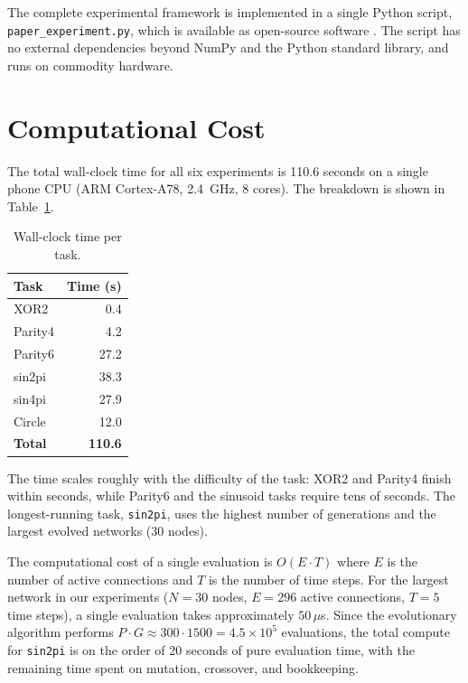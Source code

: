 The complete experimental framework is implemented in a single Python
script, \texttt{paper\_experiment.py}, which is available as
open-source software \citep{modnet2026code}. The script has no
external dependencies beyond NumPy and the Python standard library,
and runs on commodity hardware.

\section{Computational Cost}
\label{sec:cost}

The total wall-clock time for all six experiments is 110.6 seconds
on a single phone CPU (ARM Cortex-A78, 2.4~GHz, 8 cores). The
breakdown is shown in Table~\ref{tab:time}.

\begin{table}[h]
  \centering
  \small
  \caption{Wall-clock time per task.}
  \label{tab:time}
  \begin{tabular}{lr}
    \toprule
    \textbf{Task} & \textbf{Time (s)} \\
    \midrule
    XOR2      &  0.4 \\
    Parity4   &  4.2 \\
    Parity6   & 27.2 \\
    sin2pi    & 38.3 \\
    sin4pi    & 27.9 \\
    Circle    & 12.0 \\
    \midrule
    \textbf{Total} & \textbf{110.6} \\
    \bottomrule
  \end{tabular}
\end{table}

The time scales roughly with the difficulty of the task: XOR2 and
Parity4 finish within seconds, while Parity6 and the sinusoid tasks
require tens of seconds. The longest-running task, \texttt{sin2pi},
uses the highest number of generations and the largest evolved
networks (30 nodes).

The computational cost of a single evaluation is $O(E \cdot T)$ where
$E$ is the number of active connections and $T$ is the number of time
steps. For the largest network in our experiments ($N = 30$ nodes,
$E = 296$ active connections, $T = 5$ time steps), a single evaluation
takes approximately $50\,\mu$s. Since the evolutionary algorithm
performs $P \cdot G \approx 300 \cdot 1500 = 4.5 \times 10^5$
evaluations, the total compute for \texttt{sin2pi} is on the order of
$20$ seconds of pure evaluation time, with the remaining time spent on
mutation, crossover, and bookkeeping.

